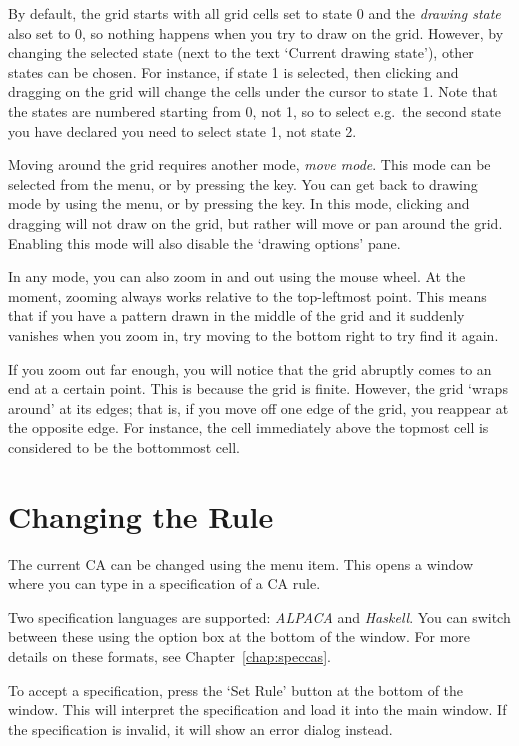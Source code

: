 \documentclass[oneside,a4paper]{memoir}
\begin{document}
By default, the grid starts with all grid cells set to state 0 and the \emph{drawing state} also set to 0,
  so nothing happens when you try to draw on the grid.
However, by changing the selected state (next to the text `Current drawing state'), other states can be chosen.
For instance, if state 1 is selected, then clicking and dragging on the grid will change the cells under the cursor to state 1.
Note that the states are numbered starting from 0, not 1,
  so to select e.g.\ the second state you have declared you need to select state 1, not state 2.

Moving around the grid requires another mode, \emph{move mode}.
This mode can be selected from the  menu, or by pressing the  key.
You can get back to drawing mode by using the  menu, or by pressing the  key.
In this mode, clicking and dragging will not draw on the grid, but rather will move or pan around the grid.
Enabling this mode will also disable the `drawing options' pane.

In any mode, you can also zoom in and out using the mouse wheel.
At the moment, zooming always works relative to the top-leftmost point.
This means that if you have a pattern drawn in the middle of the grid and it suddenly vanishes when you zoom in,
  try moving to the bottom right to try find it again.

If you zoom out far enough, you will notice that the grid abruptly comes to an end at a certain point.
This is because the grid is finite.
However, the grid `wraps around' at its edges; that is, if you move off one edge of the grid, you reappear at the opposite edge.
For instance, the cell immediately above the topmost cell is considered to be the bottommost cell.

\section{Changing the Rule}
\label{sec:chngrule}

The current CA can be changed using the  menu item.
This opens a window where you can type in a specification of a CA rule.

Two specification languages are supported: \emph{ALPACA} and \emph{Haskell}.
You can switch between these using the option box at the bottom of the window.
For more details on these formats, see Chapter~\ref{chap:speccas}.

To accept a specification, press the `Set Rule' button at the bottom of the window.
This will interpret the specification and load it into the main window.
If the specification is invalid, it will show an error dialog instead.
\end{document}
